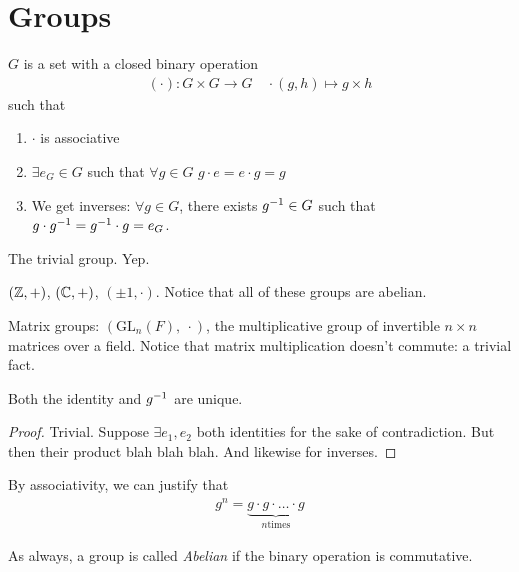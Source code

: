 \documentclass[12pt, twosided]{article}
\begin{document}
\section{Groups}

\begin{df}[Group]
  \(G\) is a set with a closed binary operation
  \begin{align*}
    (\cdot): G \times G \to G \quad \cdot (g, h) \mapsto g \times h
  \end{align*}
  such that
  \begin{enumerate}
  \item \(\cdot\) is associative
  \item \(\exists e_G \in G\) such that \(\forall g \in G\) \(g \cdot e = e \cdot g = g\)
  \item We get inverses: \(\forall g \in G\), there exists \(g^{-1} \in G\) such that \(g \cdot g^{-1} = g^{-1} \cdot g = e_G\).
  \end{enumerate}
\end{df}

\begin{exa}
  The trivial group. Yep.
\end{exa}
\begin{exa}
  \((\mathbb{Z}, +)\), \((\mathbb{C}, +)\), \((\pm 1, \cdot)\). Notice that all of these groups are abelian.
\end{exa}

\begin{exa}
  Matrix groups: \((\mathrm{GL}_n(F),\ \cdot)\), the multiplicative group of invertible \(n \times n\) matrices over a field. Notice that matrix multiplication doesn't commute: a trivial fact.
\end{exa}

\begin{prop}
  Both the identity and \(g^{-1}\) are unique.
\end{prop}
\begin{proof}
  Trivial. Suppose \(\exists e_1, e_2\) both identities for the sake of contradiction. But then their product blah blah blah. And likewise for inverses.
\end{proof}
  \begin{notn}
    By associativity, we can justify that
    \begin{align*}
      g^n = \underbrace{g \cdot g \cdot \ldots \cdot g}_{n \mathrm{times}}
    \end{align*}
  \end{notn}

  As always, a group is called \textit{Abelian} if the binary operation is commutative.
\end{document}
